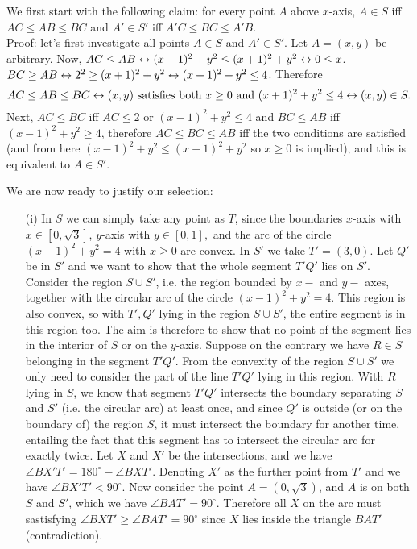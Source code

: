 \documentclass[11pt,a4paper]{article}
\begin{document}
\begin{itemize}
We first start with the following claim: 
for every point $A$ above $x$-axis, $A\in S$ iff $AC\le AB\le BC$ and $A'\in S'$ iff $A'C\le BC\le A'B$. \\
Proof: let's first investigate all points $A\in S$ and $A'\in S'$. 
Let $A=(x,y)$ be arbitrary. 
Now, $AC\le AB\leftrightarrow(x-1)^2+y^2\le  (x+1)^2+y^2\leftrightarrow 0\le x$. 
$BC\ge AB\leftrightarrow 2^2\ge (x+1)^2+y^2\leftrightarrow (x+1)^2+y^2\le 4$. 
Therefore \[AC\le AB\le BC \leftrightarrow (x,y) \text{ satisfies both } x\ge 0 \text{ and } (x+1)^2+y^2\le 4 \leftrightarrow (x,y)\in S.\] 
Next, $AC\le BC$ iff 
$AC\le 2$ or $(x-1)^2+y^2\le 4$ 
and $BC\le AB$ iff
$(x-1)^2+y^2\ge 4$, 
therefore $AC\le BC\le AB$ iff the two conditions are satisfied (and from here $(x-1)^2+y^2\le (x+1)^2+y^2$ so $x\ge 0$ is implied), 
and this is equivalent to $A\in S'$. 

We are now ready to justify our selection: 
\begin{itemize}
\item[(i)]
In $S$ we can simply take any point as $T$, since the boundaries $x$-axis with $x\in [0, \sqrt{3}]$, $y$-axis with $y\in [0, 1], $ and the arc of the circle $(x-1)^2+y^2=4$ with $x\ge 0$ are convex. 
In $S'$ we take $T'=(3,0)$. 
Let $Q'$ be in $S'$ and we want to show that the whole segment $T'Q'$ lies on $S'$. 
Consider the region $S\cup S'$, i.e. the region bounded by $x-$ and $y-$ axes, together with the circular arc of the circle $(x-1)^2+y^2=4$. 
This region is also convex, so with $T', Q'$ lying in the region $S\cup S'$, the entire segment is in this region too. 
The aim is therefore to show that no point of the segment lies in the interior of $S$ or on the $y$-axis. 
Suppose on the contrary we have $R\in S$ belonging in the segment $T'Q'$. 
From the convexity of the region $S\cup S'$ we only need to consider the part of the line $T'Q'$ lying in this region. 
With $R$ lying in $S$, we know that segment $T'Q'$ intersects the boundary separating $S$ and $S'$ (i.e. the circular arc) at least once, 
and since $Q'$ is outside (or on the boundary of) the region $S$, it must intersect the boundary for another time, 
entailing the fact that this segment has to intersect the circular arc for exactly twice. 
Let $X$ and $X'$ be the intersections, and we have 
$\angle BX'T'=180^{\circ}-\angle BXT'$. 
Denoting $X'$ as the further point from $T'$ and we have $\angle BX'T'<90^{\circ}$. 
Now consider the point $A=(0, \sqrt{3})$, and $A$ is on both $S$ and $S'$, which we have $\angle BAT'=90^{\circ}$. 
Therefore all $X$ on the arc must sastisfying $\angle BXT'\ge \angle BAT'=90^{\circ}$ since $X$ lies inside the triangle $BAT'$ 
(contradiction).


\end{itemize}
\end{itemize}
\end{document}
